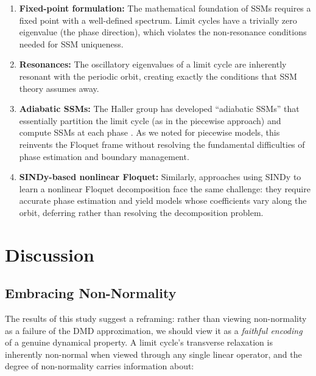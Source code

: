 \documentclass[12pt]{article}
\begin{document}
\begin{enumerate}[label=(\roman*)]
  \item \textbf{Fixed-point formulation:} The mathematical foundation
  of SSMs requires a fixed point with a well-defined spectrum. Limit
  cycles have a trivially zero eigenvalue (the phase direction), which
  violates the non-resonance conditions needed for SSM uniqueness.

  \item \textbf{Resonances:} The oscillatory eigenvalues of a limit cycle
  are inherently resonant with the periodic orbit, creating exactly the
  conditions that SSM theory assumes away.

  \item \textbf{Adiabatic SSMs:} The Haller group has developed
  ``adiabatic SSMs'' that essentially partition the limit cycle
  (as in the piecewise approach) and compute SSMs at each phase
  \citep{li2024adiabatic}. As we noted for piecewise models, this
  reinvents the Floquet frame without resolving the fundamental
  difficulties of phase estimation and boundary management.

  \item \textbf{SINDy-based nonlinear Floquet:} Similarly, approaches
  using SINDy \citep{brunton2016discovering} to learn a nonlinear
  Floquet decomposition \citep{kvalheim2021existence} face the same
  challenge: they require accurate phase estimation and yield models
  whose coefficients vary along the orbit, deferring rather than
  resolving the decomposition problem.
\end{enumerate}

\section{Discussion}
\label{sec:discussion}

\subsection{Embracing Non-Normality}

The results of this study suggest a reframing: rather than viewing
non-normality as a failure of the DMD approximation, we should view it
as a \emph{faithful encoding} of a genuine dynamical property. A limit
cycle's transverse relaxation is inherently non-normal when viewed through
any single linear operator, and the degree of non-normality carries
information about:
\end{document}
